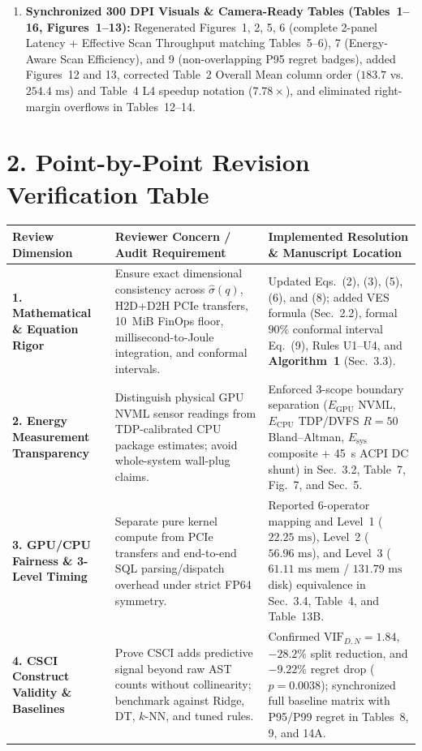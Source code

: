 \documentclass[10pt,a4paper]{article}
\begin{document}
\begin{enumerate}
  \item \textbf{Synchronized 300 DPI Visuals \& Camera-Ready Tables (Tables~1--16, Figures~1--13):} Regenerated Figures~1, 2, 5, 6 (complete 2-panel Latency + Effective Scan Throughput matching Tables~5--6), 7 (Energy-Aware Scan Efficiency), and 9 (non-overlapping P95 regret badges), added Figures~12 and 13, corrected Table~2 Overall Mean column order ($183.7$ vs.\ $254.4\text{ ms}$) and Table~4 L4 speedup notation ($7.78\times$), and eliminated right-margin overflows in Tables~12--14.
\end{enumerate}

\section*{2. Point-by-Point Revision Verification Table}
\small
\begin{longtable}{@{}p{}p{}p{}@{}}
\toprule
\textbf{Review Dimension} & \textbf{Reviewer Concern / Audit Requirement} & \textbf{Implemented Resolution \& Manuscript Location} \\
\midrule
\endhead
\textbf{1. Mathematical \& Equation Rigor} & Ensure exact dimensional consistency across $\hat{\sigma}(q)$, H2D+D2H PCIe transfers, 10~MiB FinOps floor, millisecond-to-Joule integration, and conformal intervals. & Updated Eqs.~(2), (3), (5), (6), and (8); added VES formula (Sec.~2.2), formal $90\%$ conformal interval Eq.~(9), Rules U1--U4, and \textbf{Algorithm~1} (Sec.~3.3). \\
\midrule
\textbf{2. Energy Measurement Transparency} & Distinguish physical GPU NVML sensor readings from TDP-calibrated CPU package estimates; avoid whole-system wall-plug claims. & Enforced 3-scope boundary separation ($E_{\text{GPU}}$ NVML, $E_{\text{CPU}}$ TDP/DVFS $R=50$ Bland--Altman, $E_{\text{sys}}$ composite + 45~s ACPI DC shunt) in Sec.~3.2, Table~7, Fig.~7, and Sec.~5. \\
\midrule
\textbf{3. GPU/CPU Fairness \& 3-Level Timing} & Separate pure kernel compute from PCIe transfers and end-to-end SQL parsing/dispatch overhead under strict FP64 symmetry. & Reported 6-operator mapping and Level~1 ($22.25\text{ ms}$), Level~2 ($56.96\text{ ms}$), and Level~3 ($61.11\text{ ms}$ mem / $131.79\text{ ms}$ disk) equivalence in Sec.~3.4, Table~4, and Table~13B. \\
\midrule
\textbf{4. CSCI Construct Validity \& Baselines} & Prove CSCI adds predictive signal beyond raw AST counts without collinearity; benchmark against Ridge, DT, $k$-NN, and tuned rules. & Confirmed $\text{VIF}_{D,N}=1.84$, $-28.2\%$ split reduction, and $-9.22\%$ regret drop ($p=0.0038$); synchronized full baseline matrix with P95/P99 regret in Tables~8, 9, and 14A. \\

\end{longtable}
\end{document}
